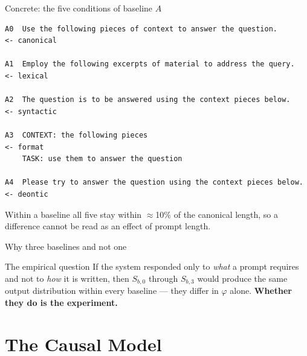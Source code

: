 \documentclass[11pt,aspectratio=169]{beamer}
\begin{document}
\begin{frame}[fragile]{Concrete: the five conditions of baseline $A$}
\begin{lstlisting}[style=promptbox]
A0  Use the following pieces of context to answer the question.        <- canonical

A1  Employ the following excerpts of material to address the query.    <- lexical

A2  The question is to be answered using the context pieces below.     <- syntactic

A3  CONTEXT: the following pieces                                      <- format
    TASK: use them to answer the question

A4  Please try to answer the question using the context pieces below.  <- deontic
\end{lstlisting}
\small
Within a baseline all five stay within $\approx$10\% of the canonical length,
so a difference cannot be read as an effect of prompt length.
\end{frame}

\begin{frame}{Why three baselines and not one}
  \begin{block}{The empirical question}
    If the system responded only to \emph{what} a prompt requires and not to
    \emph{how} it is written, then $S_{b,0}$ through $S_{b,3}$ would produce
    the same output distribution within every baseline --- they differ in
    $\varphi$ alone. \textbf{Whether they do is the experiment.}
  \end{block}
\end{frame}

\section{The Causal Model}
\end{document}

